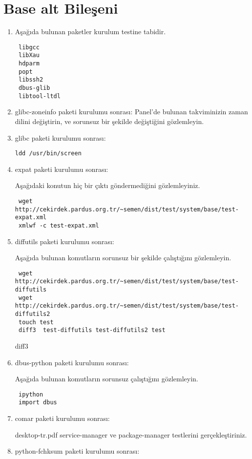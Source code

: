 \documentclass[a4paper,10pt]{article}
\begin{document}
\section{Base alt Bileşeni}

\begin{enumerate}
\item Aşağıda bulunan paketler kurulum testine tabidir.
\begin{verbatim}
 libgcc
 libXau
 hdparm
 popt
 libssh2
 dbus-glib 
 libtool-ltdl 
\end{verbatim}
\item glibc-zoneinfo paketi kurulumu sonrası:
Panel'de bulunan takviminizin zaman dilini değiştirin, ve sorunsuz bir şekilde değiştiğini gözlemleyin.


\item glibc paketi kurulumu sonrası:

\begin{verbatim}
ldd /usr/bin/screen 
\end{verbatim}

\item expat paketi kurulumu sonrası:

Aşağıdaki konutun hiç bir çıktı göndermediğini gözlemleyiniz.
\begin{verbatim}
 wget http://cekirdek.pardus.org.tr/~semen/dist/test/system/base/test-expat.xml
 xmlwf -c test-expat.xml
\end{verbatim}

\item diffutils paketi kurulumu sonrası:

Aşağıda bulunan komutların sorunsuz bir şekilde çalıştığını gözlemleyin.
\begin{verbatim}
 wget http://cekirdek.pardus.org.tr/~semen/dist/test/system/base/test-diffutils
 wget http://cekirdek.pardus.org.tr/~semen/dist/test/system/base/test-diffutils2
 touch test
 diff3  test-diffutils test-diffutils2 test 
\end{verbatim}

diff3 
\item dbus-python paketi kurulumu sonrası:

Aşağıda bulunan komutların sorunsuz çalıştığını gözlemleyin.
\begin{verbatim}
 ipython
 import dbus
\end{verbatim}


\item comar paketi kurulumu sonrası:

desktop-tr.pdf service-manager ve package-manager testlerini gerçekleştiriniz.
\item python-fchksum paketi kurulumu sonrası:


\end{enumerate}
\end{document}
